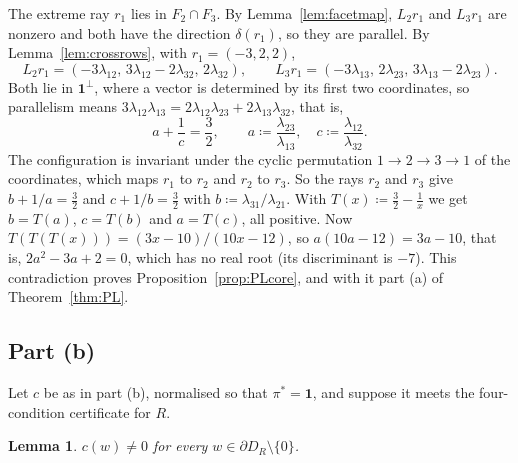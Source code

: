 \documentclass[11pt]{article}
\newcommand{\one}{\mathbf{1}}
\theoremstyle{plain}
\newtheorem{lemma}[theorem]{Lemma}
\theoremstyle{definition}
\theoremstyle{remark}
\begin{document}
The extreme ray $r_1$ lies in $F_2\cap F_3$. By Lemma~\ref{lem:facetmap}, $L_2r_1$ and
$L_3r_1$ are nonzero and both have the direction $\delta(r_1)$, so they are parallel. By
Lemma~\ref{lem:crossrows}, with $r_1=(-3,2,2)$,
\[
  L_2r_1=(-3\lambda_{12},\,3\lambda_{12}-2\lambda_{32},\,2\lambda_{32}),\qquad
  L_3r_1=(-3\lambda_{13},\,2\lambda_{23},\,3\lambda_{13}-2\lambda_{23}).
\]
Both lie in $\one^\perp$, where a vector is determined by its first two coordinates, so
parallelism means $3\lambda_{12}\lambda_{13}=2\lambda_{12}\lambda_{23}+2\lambda_{13}
\lambda_{32}$, that is,
\[
  a+\frac1c=\frac32,\qquad a\coloneqq\frac{\lambda_{23}}{\lambda_{13}},\quad
  c\coloneqq\frac{\lambda_{12}}{\lambda_{32}} .
\]
The configuration is invariant under the cyclic permutation $1\to2\to3\to1$ of the
coordinates, which maps $r_1$ to $r_2$ and $r_2$ to $r_3$. So the rays $r_2$ and $r_3$ give
$b+1/a=\frac32$ and $c+1/b=\frac32$ with $b\coloneqq\lambda_{31}/\lambda_{21}$. With
$T(x)\coloneqq\frac32-\frac1x$ we get $b=T(a)$, $c=T(b)$ and $a=T(c)$, all positive. Now
$T(T(T(x)))=(3x-10)/(10x-12)$, so $a(10a-12)=3a-10$, that is, $2a^2-3a+2=0$, which has no
real root (its discriminant is $-7$). This contradiction proves
Proposition~\ref{prop:PLcore}, and with it part (a) of Theorem~\ref{thm:PL}.

\subsection*{Part (b)}\label{app:b}

Let $c$ be as in part (b), normalised so that $\pi^\ast=\one$, and suppose it meets the
four-condition certificate for $R$.

\begin{lemma}\label{lem:nonvanish}
$c(w)\ne0$ for every $w\in\partial D_R\setminus\{0\}$.
\end{lemma}
\end{document}
